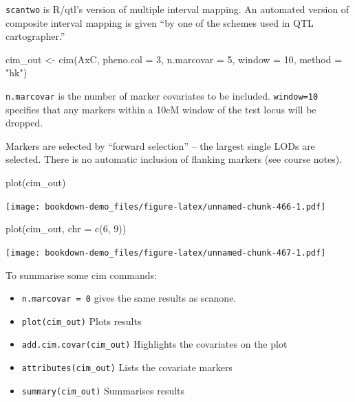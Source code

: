 \documentclass[
]{book}
\newenvironment{Shaded}{\begin{snugshade}}{\end{snugshade}}
\newcommand{\AttributeTok}[1]{\textcolor[rgb]{0.77,0.63,0.00}{#1}}
\newcommand{\DecValTok}[1]{\textcolor[rgb]{0.00,0.00,0.81}{#1}}
\newcommand{\FunctionTok}[1]{\textcolor[rgb]{0.00,0.00,0.00}{#1}}
\newcommand{\NormalTok}[1]{#1}
\newcommand{\OtherTok}[1]{\textcolor[rgb]{0.56,0.35,0.01}{#1}}
\newcommand{\StringTok}[1]{\textcolor[rgb]{0.31,0.60,0.02}{#1}}
\providecommand{\tightlist}{%
  \setlength{\itemsep}{0pt}\setlength{\parskip}{0pt}}
\begin{document}
\texttt{scantwo} is R/qtl's version of multiple interval mapping. An automated version of composite interval mapping is given ``by one of the schemes used in QTL cartographer.''

\begin{Shaded}
\begin{Highlighting}[]
\NormalTok{cim\_out }\OtherTok{\textless{}{-}} \FunctionTok{cim}\NormalTok{(AxC, }\AttributeTok{pheno.col =} \DecValTok{3}\NormalTok{, }\AttributeTok{n.marcovar =} \DecValTok{5}\NormalTok{, }\AttributeTok{window =} \DecValTok{10}\NormalTok{, }
    \AttributeTok{method =} \StringTok{"hk"}\NormalTok{)}
\end{Highlighting}
\end{Shaded}

\texttt{n.marcovar} is the number of marker covariates to be included. \texttt{window=10} specifies that any markers within a 10cM window of the test locus will be dropped.

Markers are selected by ``forward selection'' -- the largest single LODs are selected. There is no automatic inclusion of flanking markers (see course notes).

\begin{Shaded}
\begin{Highlighting}[]
\FunctionTok{plot}\NormalTok{(cim\_out)}
\end{Highlighting}
\end{Shaded}

\texttt{[image: bookdown-demo\_files/figure-latex/unnamed-chunk-466-1.pdf]}

\begin{Shaded}
\begin{Highlighting}[]
\FunctionTok{plot}\NormalTok{(cim\_out, }\AttributeTok{chr =} \FunctionTok{c}\NormalTok{(}\DecValTok{6}\NormalTok{, }\DecValTok{9}\NormalTok{))}
\end{Highlighting}
\end{Shaded}

\texttt{[image: bookdown-demo\_files/figure-latex/unnamed-chunk-467-1.pdf]}

To summarise some cim commands:

\begin{itemize}
\tightlist
\item
  \texttt{n.marcovar\ =\ 0} gives the same results as scanone.
\item
  \texttt{plot(cim\_out)} Plots results
\item
  \texttt{add.cim.covar(cim\_out)} Highlights the covariates on the plot
\item
  \texttt{attributes(cim\_out)} Lists the covariate markers
\item
  \texttt{summary(cim\_out)} Summarises results
\end{itemize}
\end{document}
